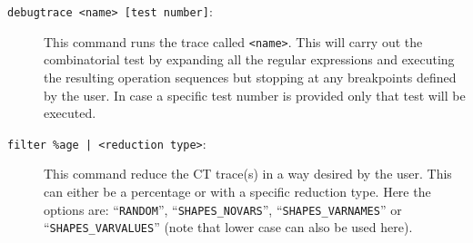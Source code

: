 \documentclass{overturerepchap}
\begin{document}
\begin{description}
\item[\texttt{debugtrace <name> [test number]}:] This command runs the
  trace called \texttt{<name>}. This will carry out the combinatorial
  test by expanding all the regular expressions and executing the
  resulting operation sequences but stopping at any breakpoints
  defined by the user. In case a specific test number is provided only
  that test will be executed. 

\item[\texttt{filter \%age | <reduction type>}:] This command reduce
  the CT trace(s) in a way desired by the user. This can either be a
  percentage or with a specific reduction type. Here the options are:
  ``\texttt{RANDOM}'', ``\texttt{SHAPES\_NOVARS}'',
  ``\texttt{SHAPES\_VARNAMES}'' or ``\texttt{SHAPES\_VARVALUES}''
  (note that lower case can also be used here). 
  

\end{description}
\end{document}
